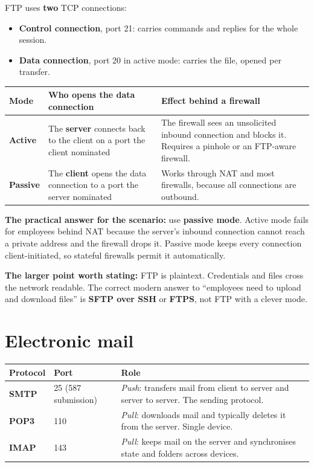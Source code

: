 \documentclass[11pt,a4paper]{article}
\begin{document}
\begin{solbox}
FTP uses \textbf{two} TCP connections:
\begin{itemize}
\item \textbf{Control connection}, port 21: carries commands and replies for the whole session.
\item \textbf{Data connection}, port 20 in active mode: carries the file, opened per transfer.
\end{itemize}

\begin{center}\small
\begin{tabularx}{\textwidth}{>{\bfseries}p{} X X}
\toprule Mode & Who opens the data connection & Effect behind a firewall\\
\midrule
Active & The \textbf{server} connects back to the client on a port the client nominated & The firewall sees an unsolicited inbound connection and blocks it. Requires a pinhole or an FTP-aware firewall.\\
Passive & The \textbf{client} opens the data connection to a port the server nominated & Works through NAT and most firewalls, because all connections are outbound.\\
\bottomrule
\end{tabularx}
\end{center}

\textbf{The practical answer for the scenario:} use \textbf{passive mode}. Active mode fails for employees behind NAT because the server's inbound connection cannot reach a private address and the firewall drops it. Passive mode keeps every connection client-initiated, so stateful firewalls permit it automatically.

\textbf{The larger point worth stating:} FTP is plaintext. Credentials and files cross the network readable. The correct modern answer to ``employees need to upload and download files'' is \textbf{SFTP over SSH} or \textbf{FTPS}, not FTP with a clever mode.
\end{solbox}

\section{Electronic mail}

\begin{center}\small
\begin{tabularx}{\textwidth}{>{\bfseries}p{} p{} X}
\toprule Protocol & Port & Role\\
\midrule
SMTP & 25 (587 submission) & \emph{Push}: transfers mail from client to server and server to server. The sending protocol.\\
POP3 & 110 & \emph{Pull}: downloads mail and typically deletes it from the server. Single device.\\
IMAP & 143 & \emph{Pull}: keeps mail on the server and synchronises state and folders across devices.\\
\bottomrule
\end{tabularx}
\end{center}
\end{document}
